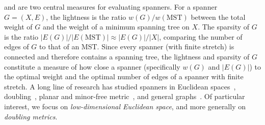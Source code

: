 \documentclass[11pt]{article}
\begin{document}
 and  are two central measures for evaluating spanners. For a spanner $G=(X,E)$, the lightness is the ratio $w(G)/w(\mathrm{MST})$ between the total weight of $G$ and the weight of a minimum spanning tree on $X$. The sparsity of $G$ is the ratio $|E(G)|/|E(\mathrm{MST})| \approx |E(G)|/|X|$, comparing the number of edges of $G$ to that of an MST. 
Since every spanner (with finite stretch) is connected and therefore contains a spanning tree, the lightness and sparsity of $G$ 
constitute a measure of how close a spanner (specifically $w(G)$ and $|E(G)|$) to the optimal weight and the optimal number of edges of a spanner with finite stretch.
A long line of research has studied spanners in Euclidean spaces~\cite{arya1995euclidean, rao1998approximating,HarPeledIS13,
 ElkinS15,FiltserN22,BhoreT22,LeS25}, doubling~\cite{gao2004deformable,chan2009small,smid2009weak, gottlieb2015light, FS20, BLW19, BhoreM25}, planar and minor-free metric~\cite{borradaile2017minor, grigni2002light, cohen2020light, BhoreKK0LPT25}, and general graphs~\cite{peleg1989graph,althofer1993sparse,ElkinS16,ElkinNS15,chechik2018near,FS20,LeS23,Bodwin24}. 
Of particular interest, we focus on \emph{low-dimensional Euclidean space}, and more generally on \emph{doubling metrics}. 
\end{document}
